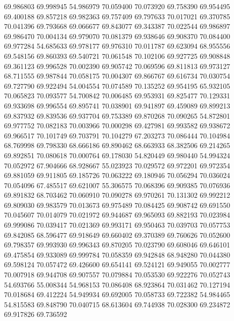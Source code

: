 69.986803
69.998945
54.986979
70.059400
70.073920
69.758390
69.954495
69.400188
69.857218
69.982363
69.757409
69.797633
70.017021
69.370785
70.041396
69.793668
69.066677
69.843077
69.343387
70.022544
69.986897
69.986470
70.004134
69.979070
70.081379
69.938646
69.908370
70.084400
69.977284
54.685633
69.978177
69.976310
70.011787
69.623094
68.955556
69.548156
69.860393
69.540721
70.061548
70.102106
69.927725
69.908848
69.361123
69.996528
70.002390
69.905742
70.069596
69.811813
69.973127
68.711555
69.987844
70.058175
70.004307
69.866767
69.616734
70.030754
69.727790
69.922494
54.004554
70.074589
70.135252
69.954195
65.932105
70.065823
70.093577
54.700842
70.006485
69.953931
69.825477
70.129331
69.933698
69.996554
69.895741
70.038901
69.941897
69.459089
69.899213
69.837932
69.839536
69.937704
69.753389
69.870268
70.090265
54.872801
69.977752
70.082183
70.003966
70.000298
69.427981
69.993582
69.938672
69.966517
70.101749
69.703791
70.104279
67.203273
70.086444
70.104984
68.769998
69.798330
68.666186
69.890462
68.663933
68.382506
69.214265
69.892851
70.080618
70.000764
69.178030
54.820449
69.980440
54.994324
70.052972
67.904666
68.928667
55.023923
70.029572
69.972201
69.972354
69.881059
69.911805
69.185726
70.063222
69.180946
70.056294
70.036024
70.054096
67.485517
69.621007
55.306575
70.068396
69.909385
70.076936
69.891832
68.703462
70.060910
70.090278
69.970261
70.131302
69.992212
69.809030
69.983579
70.013673
69.975489
70.084425
69.908742
69.691550
70.045607
70.014079
70.021972
69.944687
69.965093
69.882193
70.023984
69.999086
70.039417
70.021369
69.993171
69.950463
70.039703
70.057753
69.842085
68.596477
69.918649
69.660402
69.370389
69.760626
70.052600
69.798357
69.993930
69.996343
69.870205
70.023790
69.608046
69.646101
69.475854
69.933089
69.999784
70.058359
69.942848
68.948280
70.044380
69.598124
70.057472
69.426600
69.654141
69.524121
69.949055
70.002777
70.007918
69.944708
69.907557
70.079884
70.053530
69.922276
70.052743
54.693766
55.008344
54.968153
70.086408
68.923864
70.031462
70.127194
70.018684
69.412224
54.949934
69.692005
70.058733
69.722382
54.984465
54.815583
69.848790
70.040715
68.613604
69.744938
70.028300
69.234872
69.917826
69.736592
